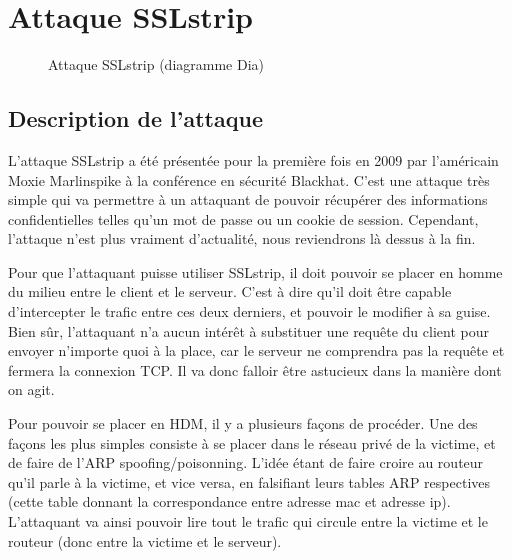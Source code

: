 \chapter{Attaque SSLstrip}

\label{sec:sslstrip}

\begin{figure}[H]
  \caption{Attaque SSLstrip (diagramme Dia)}
\end{figure}

\section{Description de l'attaque}

L'attaque SSLstrip a été présentée pour la première fois en 2009 par l'américain Moxie Marlinspike à la conférence en sécurité Blackhat. C'est une attaque très simple qui va permettre à un attaquant de pouvoir récupérer des informations confidentielles telles qu'un mot de passe ou un cookie de session. Cependant, l'attaque n'est plus vraiment d'actualité, nous reviendrons là dessus à la fin.

Pour que l'attaquant puisse utiliser SSLstrip, il doit pouvoir se placer en homme du milieu entre le client et le serveur. C'est à dire qu'il doit être capable d'intercepter le trafic entre ces deux derniers, et pouvoir le modifier à sa guise. Bien sûr, l'attaquant n'a aucun intérêt à substituer une requête du client pour envoyer n'importe quoi à la place, car le serveur ne comprendra pas la requête et fermera la connexion TCP. Il va donc falloir être astucieux dans la manière dont on agit.

Pour pouvoir se placer en HDM, il y a plusieurs façons de procéder. Une des façons les plus simples consiste à se placer dans le réseau privé de la victime, et de faire de l'ARP spoofing/poisonning. L'idée étant de faire croire au routeur qu'il parle à la victime, et vice versa, en falsifiant leurs tables ARP respectives (cette table donnant la correspondance entre adresse mac et adresse ip). L'attaquant va ainsi pouvoir lire tout le trafic qui circule entre la victime et le routeur (donc entre la victime et le serveur).

